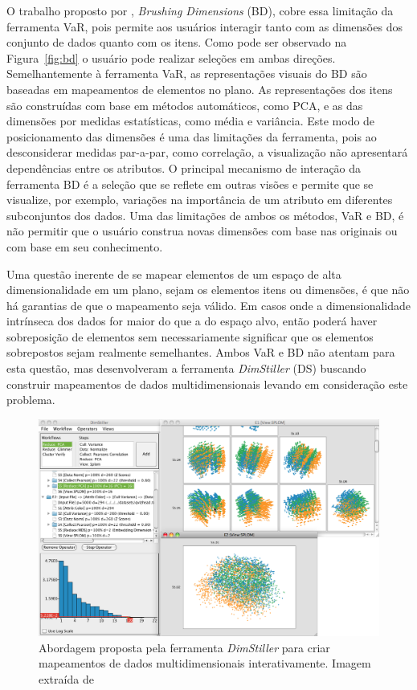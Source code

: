 O trabalho proposto por \citet{Turkay2011}, \emph{Brushing
Dimensions} (BD), cobre essa limitação da ferramenta
VaR, pois permite aos usuários interagir tanto com as
dimensões dos conjunto de dados quanto com os itens.  Como
pode ser observado na Figura~\ref{fig:bd} o usuário pode
realizar seleções em ambas direções. Semelhantemente à
ferramenta VaR, as representações visuais do BD são baseadas
em mapeamentos de elementos no plano. As representações dos
itens são construídas com base em métodos automáticos, como
PCA, e as das dimensões por medidas estatísticas, como média
e variância. Este modo de posicionamento das dimensões é uma
das limitações da ferramenta, pois ao desconsiderar medidas
par-a-par, como correlação, a visualização não apresentará
dependências entre os atributos. O principal mecanismo de
interação da ferramenta BD é a seleção que se reflete em
outras visões e permite que se visualize, por exemplo,
variações na importância de um atributo em diferentes
subconjuntos dos dados. Uma das limitações de ambos os
métodos, VaR e BD, é não permitir que o usuário construa
novas dimensões com base nas originais ou com base em seu
conhecimento.

Uma questão inerente de se mapear elementos de um espaço de
alta dimensionalidade em um plano, sejam os elementos itens
ou dimensões, é que não há garantias de que o mapeamento
seja válido. Em casos onde a dimensionalidade intrínseca dos
dados for maior do que a do espaço alvo, então poderá haver
sobreposição de elementos sem necessariamente significar que
os elementos sobrepostos sejam realmente semelhantes. Ambos
VaR e BD não atentam para esta questão, mas
\citet{Ingram2010} desenvolveram a ferramenta
\emph{DimStiller} (DS) buscando construir mapeamentos de
dados multidimensionais levando em consideração este
problema. 

\begin{figure}[h!]
    \centering
    \includegraphics[width=16cm]{images/ds.png}
    \caption[DimStiller]
    {Abordagem proposta pela ferramenta \emph{DimStiller}
    para criar mapeamentos de dados multidimensionais
interativamente. Imagem extraída de \cite{Ingram2010}}
    \label{fig:ds}
\end{figure}

